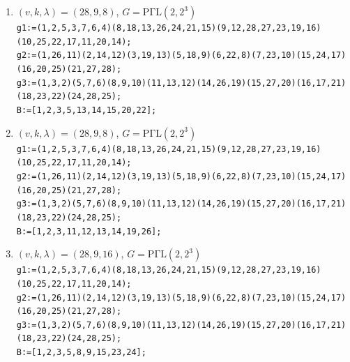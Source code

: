 \documentclass[a4paper,twopage,reqno,12pt]{amsart}
\theoremstyle{definition}
\numberwithin{equation}{section}
\newcommand{\PGaL}{\mathrm{P\Gamma L}}
\newcommand{\Aut}{\mathrm{Aut}}
\begin{document}
\begin{enumerate}
    \item\label{2898_1} $(v,k,\lambda)=(28,9,8)$, $G=\PGaL(2,2^3)$\\
    {\scriptsize \texttt{g1:=(1,2,5,3,7,6,4)(8,18,13,26,24,21,15)(9,12,28,27,23,19,16)(10,25,22,17,11,20,14);}\\
    \texttt{g2:=(1,26,11)(2,14,12)(3,19,13)(5,18,9)(6,22,8)(7,23,10)(15,24,17)(16,20,25)(21,27,28);}\\
    \texttt{g3:=(1,3,2)(5,7,6)(8,9,10)(11,13,12)(14,26,19)(15,27,20)(16,17,21)(18,23,22)(24,28,25);}}\\
    \texttt{B:=[1,2,3,5,13,14,15,20,22];}\\

    \item\label{2898_2} $(v,k,\lambda)=(28,9,8)$, $G=\PGaL(2,2^3)$\\
    {\scriptsize \texttt{g1:=(1,2,5,3,7,6,4)(8,18,13,26,24,21,15)(9,12,28,27,23,19,16)(10,25,22,17,11,20,14);}\\
    \texttt{g2:=(1,26,11)(2,14,12)(3,19,13)(5,18,9)(6,22,8)(7,23,10)(15,24,17)(16,20,25)(21,27,28);}\\
    \texttt{g3:=(1,3,2)(5,7,6)(8,9,10)(11,13,12)(14,26,19)(15,27,20)(16,17,21)(18,23,22)(24,28,25);}}\\
    \texttt{B:=[1,2,3,11,12,13,14,19,26];}\\

    \item\label{28916} $(v,k,\lambda)=(28,9,16)$, $G=\PGaL(2,2^3)$\\
    {\scriptsize \texttt{g1:=(1,2,5,3,7,6,4)(8,18,13,26,24,21,15)(9,12,28,27,23,19,16)(10,25,22,17,11,20,14);}\\
    \texttt{g2:=(1,26,11)(2,14,12)(3,19,13)(5,18,9)(6,22,8)(7,23,10)(15,24,17)(16,20,25)(21,27,28);}\\
    \texttt{g3:=(1,3,2)(5,7,6)(8,9,10)(11,13,12)(14,26,19)(15,27,20)(16,17,21)(18,23,22)(24,28,25);}}\\
    \texttt{B:=[1,2,3,5,8,9,15,23,24];}\\


\end{enumerate}
\end{document}
